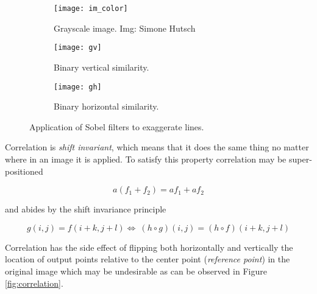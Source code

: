 \begin{figure}[H]
  \centering
  \begin{subfigure}[b]{0.3\textwidth}
      \texttt{[image: im\_color]}
      \caption{Grayscale image. Img: Simone Hutsch}
  \end{subfigure}
  \begin{subfigure}[b]{0.3\textwidth}
      \texttt{[image: gv]}
      \caption{Binary vertical similarity.}
      \label{fig:vert}
  \end{subfigure}
  \begin{subfigure}[b]{0.3\textwidth}
      \texttt{[image: gh]}
      \caption{Binary horizontal similarity.}
      \label{fig:hoz}
  \end{subfigure}
  \caption{Application of Sobel filters to exaggerate lines.}
  \label{fig:sobel_apply}
\end{figure}

Correlation is \emph{shift invariant}, which means that it does the same thing no matter where in an image it is applied. To satisfy this property correlation may be super-positioned 

\[a(f_1 + f_2) = af_1 + af_2\]

and abides by the shift invariance principle

\[g(i,j)=f(i+k,j+l) \Leftrightarrow\ (h\circ g)(i,j)=(h\circ f)(i+k,j+l)\]

Correlation has the side effect of flipping both horizontally and vertically the location of output points relative to the center point (\emph{reference point}) in the original image which may be undesirable as can be observed in Figure \ref{fig:correlation}.

